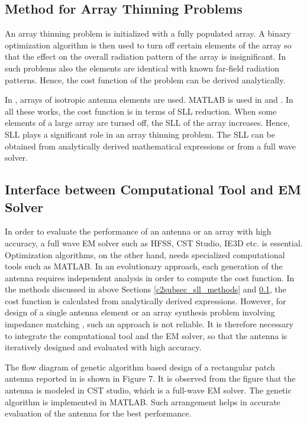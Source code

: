 \subsection{Method for Array Thinning Problems} \label{c2subsec_thinning}
An array thinning problem is initialized with a fully populated array. A binary optimization algorithm is then used to turn off certain elements of the array so that the effect on the overall radiation pattern of the array is insignificant. In such problems also the elements are identical with known far-field radiation patterns. Hence, the cost function of the problem can be derived analytically.

In \cite{arrayThin1, arrayThin2, arrayThin3}, arrays of isotropic antenna elements are used. MATLAB is used in \cite{arrayThin2} and \cite{arrayThin3}. In all these works, the cost function is in terms of SLL reduction. When some elements of a large array are turned off, the SLL of the array increases. Hence, SLL plays a significant role in an array thinning problem. The SLL can be obtained from analytically derived mathematical expressions or from a full wave solver.

\subsection{Interface between Computational Tool and EM Solver} \label{c2subsec_tools}
In order to evaluate the performance of an antenna or an array with high accuracy, a full wave EM solver such as HFSS, CST Studio, IE3D etc. is essential. Optimization algorithms, on the other hand, needs specialized computational tools such as MATLAB. In an evolutionary approach, each generation of the antenna requires independent analysis in order to compute the cost function. In the methods discussed in above Sections \ref{c2subsec_sll_methods} and \ref{c2subsec_thinning}, the cost function is calculated from analytically derived expressions. However, for design of a single antenna element \cite{patch_miniaturize_ga, optPatch, freqReconfCogn} or an array synthesis problem involving impedance matching \cite{arraySynth1}, such an approach is not reliable. It is therefore necessary to integrate the computational tool and the EM solver, so that the antenna is iteratively designed and evaluated with high accuracy.

The flow diagram of genetic algorithm based design of a rectangular patch antenna reported in \cite{patch_miniaturize_ga} is shown in Figure 7. It is observed from the figure that the antenna is modeled in CST studio, which is a full-wave EM solver. The genetic algorithm is implemented in MATLAB. Such arrangement helps in accurate evaluation of the antenna for the best performance.

